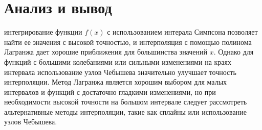 \documentclass[13pt, a4paper, twoside]{article}
\begin{document}
\section{Анализ и вывод}
 интегрирование функции $f(x)$ с использованием интерала Симпсона позволяет найти ее значения с высокой точностью, и интерполяция с помощью полинома Лагранжа дает хорошие приближения для большинства значений $x$.
Однако для функций с большими колебаниями или сильными изменениями на краях интервала использование узлов Чебышева значительно улучшает точность интерполяции.
Метод Лагранжа является хорошим выбором для малых интервалов и функций с достаточно гладкими изменениями, но при необходимости высокой точности на большом интервале следует рассмотреть альтернативные методы интерполяции, такие как сплайны или использование узлов Чебышева.
\end{document}
